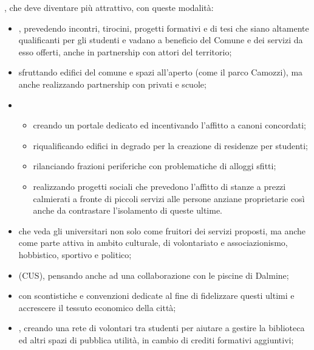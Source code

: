 , che deve diventare più attrattivo, con queste modalità:
\begin{itemize}
  \item {}, prevedendo incontri, tirocini, progetti formativi e di tesi che siano altamente qualificanti per gli studenti e vadano a beneficio del Comune e dei servizi da esso offerti, anche in partnership con attori del territorio;
  \item {} sfruttando edifici del comune e spazi all'aperto (come il parco Camozzi), ma anche realizzando partnership con privati e scuole;
\end{itemize}
\begin{bluebox}
  \begin{itemize}
    \item {} \begin{itemize}
      \item %
      {creando un portale dedicato} ed incentivando l'affitto a canoni concordati;
      \item %
      {riqualificando edifici in degrado} per la creazione di residenze per studenti;
      \item %
      {rilanciando frazioni periferiche} con problematiche di alloggi sfitti;
      \item %
      {realizzando progetti sociali} che prevedono l'affitto di stanze a prezzi calmierati a fronte di piccoli servizi alle persone anziane proprietarie così anche da contrastare l'isolamento di queste ultime.
    \end{itemize}
  \end{itemize}
\end{bluebox}  
\begin{itemize}
  \item {} che veda gli universitari non solo come fruitori dei servizi proposti, ma anche come parte attiva in ambito culturale, di volontariato e associazionismo, hobbistico, sportivo e politico;
  \item {} (CUS), pensando anche ad una collaborazione con le piscine di Dalmine;
  \item {} con scontistiche e convenzioni dedicate al fine di fidelizzare questi ultimi e accrescere il tessuto economico della città;
  \item {}, creando una rete di volontari tra studenti per aiutare a gestire la biblioteca ed altri spazi di pubblica utilità, in cambio di crediti formativi aggiuntivi;
\end{itemize}
